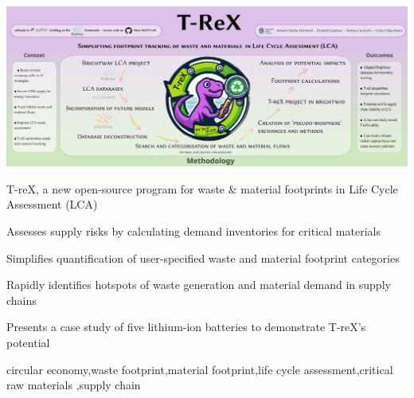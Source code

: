 \documentclass[a4paper,fleqn]{cas-dc}
\begin{document}
\begin{graphicalabstract}
	\includegraphics[width=1\columnwidth]{figs/grabs_T-reX_graphical-abstract.pdf}
	\end{graphicalabstract}



\begin{highlights}
	\item T-reX, a new open-source program for waste \& material footprints in Life Cycle Assessment (LCA)
	\item Assesses supply risks by calculating demand inventories for critical materials
	\item Simplifies quantification of user-specified waste and material footprint categories
	\item Rapidly identifies hotspots of waste generation and material demand in supply	chains
	\item Presents a case study of five lithium-ion batteries to demonstrate T-reX's potential
\end{highlights}


\begin{keywords}
circular economy\sep waste footprint\sep material footprint\sep life cycle assessment\sep critical raw materials \sep supply chain
\end{keywords}

\maketitle
\end{document}
